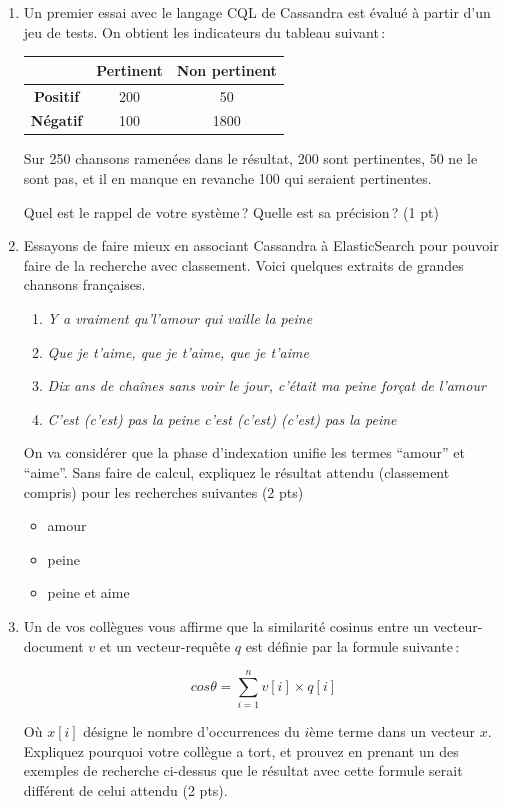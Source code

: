 \documentclass[11pt,a4paper]{article}
\begin{document}
\begin{enumerate}

  \item Un premier essai 
avec le langage CQL de Cassandra est évalué à partir d'un jeu de tests. On obtient les indicateurs 
du tableau suivant\,:

\bigskip
\begin{center}
\begin{tabular}{c|c|c}
   & \textbf{Pertinent} & \textbf{Non pertinent} \\ \hline \hline
   \textbf{Positif}  & 200 &  50 \\ \hline
   \textbf{Négatif}  & 100 & 1800 \\ \hline
\end{tabular}
\end{center}
\bigskip

Sur 250 chansons ramenées dans le résultat, 200 sont pertinentes, 50 ne le sont pas, et il en manque en revanche 100 qui
seraient pertinentes. 

   Quel est le rappel de votre système\,? Quelle est sa précision\,? (1 pt)
   
   
  \item Essayons de faire mieux en associant Cassandra à ElasticSearch pour pouvoir faire de la recherche avec classement.
     Voici quelques extraits de  grandes chansons françaises.

\begin{enumerate}
  \item \textit{Y a vraiment qu'l'amour qui vaille la peine}
  \item \textit{Que je t'aime, que je t'aime, que je t'aime}
  \item \textit{Dix ans de chaînes sans voir le jour, c'était ma peine forçat de l'amour}
  \item \textit{C'est (c'est) pas la peine c'est (c'est) (c'est) pas la peine}
\end{enumerate}

On va considérer que la phase d'indexation unifie les termes ``amour'' et ``aime''. Sans faire de calcul,
expliquez le résultat attendu (classement compris) pour les recherches suivantes (2 pts)

\begin{itemize}
   \item amour
   \item peine
   \item peine et aime
\end{itemize}

 \item Un de vos collègues vous affirme que la similarité cosinus entre un vecteur-document $v$ 
 et un vecteur-requête $q$ est  définie par la formule suivante\,:
 
    $$cos { } \theta  = \sum_{i=1}^n v[i] \times q[i]$$
 
    Où $x[i]$ désigne le nombre d'occurrences du $i$ème terme dans un vecteur $x$. Expliquez pourquoi 
    votre collègue  a tort, et prouvez en prenant un des exemples de recherche ci-dessus que le résultat avec cette formule serait 
    différent de celui attendu (2 pts).
\end{enumerate}
\end{document}
